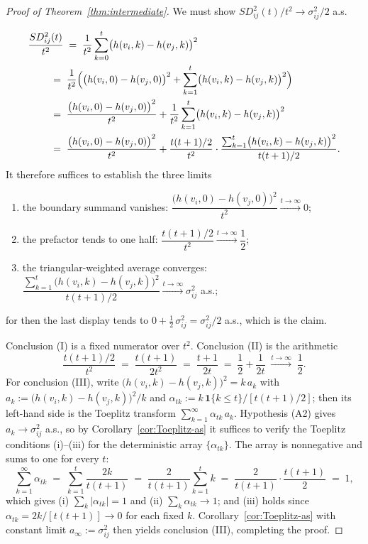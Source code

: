 \documentclass[11pt]{article}
\theoremstyle{definition}
\begin{document}
\begin{proof}[Proof of Theorem~\ref{thm:intermediate}]
We must show $SD^2_{ij}(t)/t^2 \to \sigma^2_{ij}/2$ a.s.

\begin{align*}
  \MoveEqLeft[2] \frac{SD^2_{ij}(t)}{t^2}
   \;=\; \frac{1}{t^2}\sum_{k=0}^{t} \bigl(h(v_i,k)-h(v_j,k)\bigr)^2 \\
  &\;=\; \frac{1}{t^2}\Bigl(\bigl(h(v_i,0)-h(v_j,0)\bigr)^2 + \sum_{k=1}^{t} \bigl(h(v_i,k)-h(v_j,k)\bigr)^2\Bigr) \\
  &\;=\; \frac{\bigl(h(v_i,0)-h(v_j,0)\bigr)^2}{t^2} + \frac{1}{t^2}\sum_{k=1}^{t} \bigl(h(v_i,k)-h(v_j,k)\bigr)^2 \\
  &\;=\; \frac{\bigl(h(v_i,0)-h(v_j,0)\bigr)^2}{t^2} + \frac{t(t+1)/2}{t^2}\cdot\frac{\sum_{k=1}^{t} \bigl(h(v_i,k)-h(v_j,k)\bigr)^2}{t(t+1)/2} .
\end{align*}
It therefore suffices to establish the three limits
\begin{enumerate}[label=\textnormal{(\Roman*)}, leftmargin=2.8em]
  \item the boundary summand vanishes: $\dfrac{\bigl(h(v_i,0)-h(v_j,0)\bigr)^2}{t^2} \xrightarrow{t\to\infty} 0$;
  \item the prefactor tends to one half: $\dfrac{t(t+1)/2}{t^2} \xrightarrow{t\to\infty} \dfrac12$;
  \item the triangular-weighted average converges: $\dfrac{\sum_{k=1}^{t} \bigl(h(v_i,k)-h(v_j,k)\bigr)^2}{t(t+1)/2} \xrightarrow{t\to\infty} \sigma^2_{ij}$ a.s.;
\end{enumerate}
for then the last display tends to $0 + \tfrac12\,\sigma^2_{ij} = \sigma^2_{ij}/2$ a.s., which is the claim.

Conclusion (I) is a fixed numerator over $t^2$. Conclusion (II) is the arithmetic
\[
  \frac{t(t+1)/2}{t^2} \;=\; \frac{t(t+1)}{2t^2} \;=\; \frac{t+1}{2t} \;=\; \frac12 + \frac{1}{2t} \;\xrightarrow{t \to \infty}\; \frac12 .
\]
For conclusion (III), write $\bigl(h(v_i,k)-h(v_j,k)\bigr)^2 = k\,a_k$ with $a_k := \bigl(h(v_i,k)-h(v_j,k)\bigr)^2/k$ and $\alpha_{tk} := k\,\mathbf{1}\{k \leq t\}/[t(t+1)/2]$; then its left-hand side is the Toeplitz transform $\sum_{k=1}^{\infty} \alpha_{tk}\,a_k$. Hypothesis (A2) gives $a_k \to \sigma^2_{ij}$ a.s., so by Corollary~\ref{cor:Toeplitz-as} it suffices to verify the Toeplitz conditions (i)--(iii) for the deterministic array $\{\alpha_{tk}\}$. The array is nonnegative and sums to one for every $t$:
\[
  \sum_{k=1}^{\infty} \alpha_{tk}
  \;=\; \sum_{k=1}^{t} \frac{2k}{t(t+1)}
  \;=\; \frac{2}{t(t+1)}\sum_{k=1}^{t} k
  \;=\; \frac{2}{t(t+1)}\cdot\frac{t(t+1)}{2}
  \;=\; 1 ,
\]
which gives (i) $\sum_{k} |\alpha_{tk}| = 1$ and (ii) $\sum_{k} \alpha_{tk} \to 1$; and (iii) holds since $\alpha_{tk} = 2k/[t(t+1)] \to 0$ for each fixed $k$. Corollary~\ref{cor:Toeplitz-as} with constant limit $a_\infty := \sigma^2_{ij}$ then yields conclusion (III), completing the proof.
\end{proof}
\end{document}
